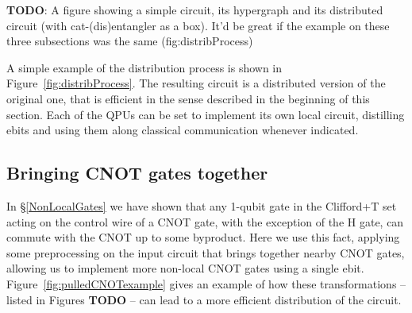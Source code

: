 \begin{comment}
\begin{algorithm}[caption={Algorithm for distributing a circuit using an assignment \(qpuOf \colon \mathbb{N} \to \mathbb{N}\) which indicates the QPU number of the given wire},label={code:distribution}]
input: circuit, $qpuOf$
output: distributed
begin
  distributed $\gets$ $emptyCircuit$
  foreach wire in circuit do
    thisQPU = $qpuOf$(wire)
    activeConnections $\gets$ $\varnothing$
    foreach gate in wire do
      if gate == CNOT and $controlOf$(gate) == wire then
        targetQPU = $qpuOf$($targetOf$(gate))
        if targetQPU == thisQPU then
          distributed.$addCNOTAt$(wire,target)
        else
          ebit $\gets$ activeConnections.$at$(targetQPU)
          if ebit == null then
            ebit $\gets$ $distillEbit$(thisQPU, targetQPU)
            distributed.$addCatEntangler$(ebit, wire)
            activeConnections.$at$(targetQPU) $\gets$ ebit
          distributed.$addCNOTAt$(ebit,$targetOf$(gate))
      else
        distributed.$addGateAt$(gate,wire)
end
\end{algorithm}
\end{comment}


\textbf{TODO}: A figure showing a simple circuit, its hypergraph and its distributed circuit (with cat-(dis)entangler as a box). It'd be great if the example on these three subsections was the same (fig:distribProcess)

A simple example of the distribution process is shown in Figure~\ref{fig:distribProcess}. The resulting circuit is a distributed version of the original one, that is efficient in the sense described in the beginning of this section. Each of the QPUs can be set to implement its own local circuit, distilling ebits and using them along classical communication whenever indicated.


\subsection{Bringing CNOT gates together}
\label{pullCNOTs}

In \S\ref{NonLocalGates} we have shown that any 1-qubit gate in the Clifford+T set acting on the control wire of a CNOT gate, with the exception of the H gate, can commute with the CNOT up to some byproduct. Here we use this fact, applying some preprocessing on the input circuit that brings together nearby CNOT gates, allowing us to implement more non-local CNOT gates using a single ebit. Figure~\ref{fig:pulledCNOTexample} gives an example of how these transformations -- listed in Figures \textbf{TODO} -- can lead to a more efficient distribution of the circuit.

